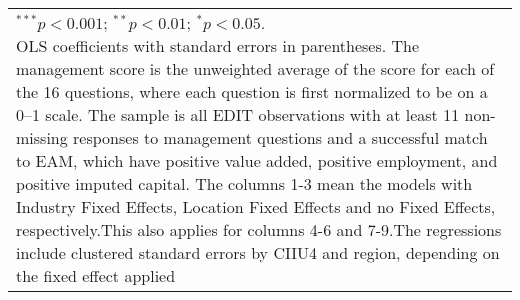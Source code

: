 \documentclass{article}
\begin{document}
\begin{table}
\begin{center}
\begin{small}
\begin{tabular}{l c c c c c c c c c}
\hline
\multicolumn{10}{l}{\tiny{\parbox{0.95\linewidth}{\vspace{3pt}$^{***}p<0.001$; $^{**}p<0.01$; $^{*}p<0.05$. \\OLS coefficients with standard errors in parentheses. The management score is the unweighted average of the score for each of the 16 questions, where each question is first normalized to be on a 0–1 scale. The sample is all EDIT observations with at least 11 non-missing responses to management questions and a successful match to EAM, which have positive value added, positive employment, and positive imputed capital. The columns 1-3 mean the models with Industry Fixed Effects, Location Fixed Effects and no Fixed Effects, respectively.This also applies for columns 4-6 and 7-9.The regressions include clustered standard errors by CIIU4 and region, depending on the fixed effect applied}}}
\end{tabular}
\end{small}
\label{table:coefficients}
\end{center}
\end{table}
\end{document}
